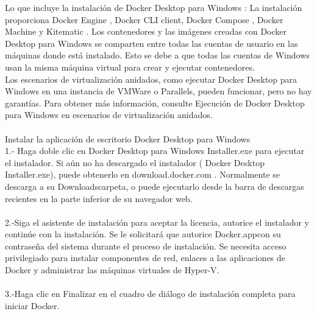 \documentclass[twoside,onecolumn]{article}
\begin{document}
\begin{flushright}
\begin{itemize}
Lo que incluye la instalación de Docker Desktop para Windows : La instalación proporciona Docker Engine , Docker CLI client, Docker Compose , Docker Machine y Kitematic .
Los contenedores y las imágenes creadas con Docker Desktop para Windows se comparten entre todas las cuentas de usuario en las máquinas donde está instalado. Esto se debe a que todas las cuentas de Windows usan la misma máquina virtual para crear y ejecutar contenedores.\textbf{}\\
Los escenarios de virtualización anidados, como ejecutar Docker Desktop para Windows en una instancia de VMWare o Parallels, pueden funcionar, pero no hay garantías. Para obtener más información, consulte Ejecución de Docker Desktop para Windows en escenarios de virtualización anidados.\textbf{}\\
\textbf{}\\
Instalar la aplicación de escritorio Docker Desktop para Windows
\textbf{}\\
1.- Haga doble clic en Docker Desktop para Windows Installer.exe para ejecutar el instalador.
Si aún no ha descargado el instalador ( Docker Desktop Installer.exe), puede obtenerlo en download.docker.com . Normalmente se descarga a su Downloadscarpeta, o puede ejecutarlo desde la barra de descargas recientes en la parte inferior de su navegador web.
\textbf{}\\
\textbf{}\\
2.-Siga el asistente de instalación para aceptar la licencia, autorice el instalador y continúe con la instalación.
Se le solicitará que autorice Docker.appcon su contraseña del sistema durante el proceso de instalación. Se necesita acceso privilegiado para instalar componentes de red, enlaces a las aplicaciones de Docker y administrar las máquinas virtuales de Hyper-V.
\textbf{}\\
\textbf{}\\
3.-Haga clic en Finalizar en el cuadro de diálogo de instalación completa para iniciar Docker.


\end{itemize}
\end{flushright}
\end{document}
